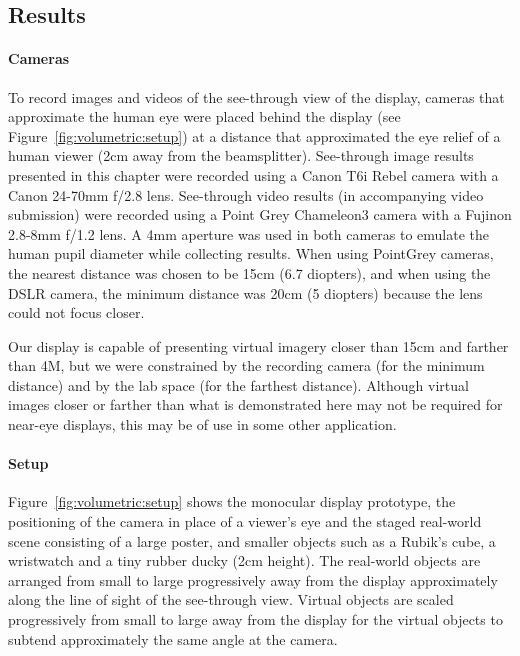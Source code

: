 
\subsection{Results}
\label{sec:volumetric:results}
\paragraph{Cameras}
To record images and videos of the see-through view of the display, cameras that approximate the human eye were placed behind the display (see Figure~\ref{fig:volumetric:setup}) at a distance that approximated the eye relief of a human viewer (2cm away from the beamsplitter). See-through image results presented in this chapter were recorded using a Canon T6i Rebel camera with a Canon 24-70mm f/2.8 lens. See-through video results (in accompanying video submission) were recorded using a Point Grey Chameleon3 camera with a Fujinon 2.8-8mm f/1.2 lens. A 4mm aperture was used in both cameras to emulate the human pupil diameter while collecting results. When using PointGrey cameras, the nearest distance was chosen to be 15cm (6.7 diopters), and when using the DSLR camera, the minimum distance was 20cm (5 diopters) because the lens could not focus closer. 

Our display is capable of presenting virtual imagery closer than 15cm and farther than 4M, but we were constrained by the recording camera (for the minimum distance) and by the lab space (for the farthest distance). Although virtual images closer or farther than what is demonstrated here may not be required for near-eye displays, this may be of use in some other application.

\paragraph{Setup}
Figure~\ref{fig:volumetric:setup} shows the monocular display prototype, the positioning of the camera in place of a viewer's eye and the staged real-world scene consisting of a large poster, and smaller objects such as a Rubik's cube, a wristwatch and a tiny rubber ducky (2cm height). The real-world objects are arranged from small to large progressively away from the display approximately along the line of sight of the see-through view. Virtual objects are scaled progressively from small to large away from the display for the virtual objects to subtend approximately the same angle at the camera. 


